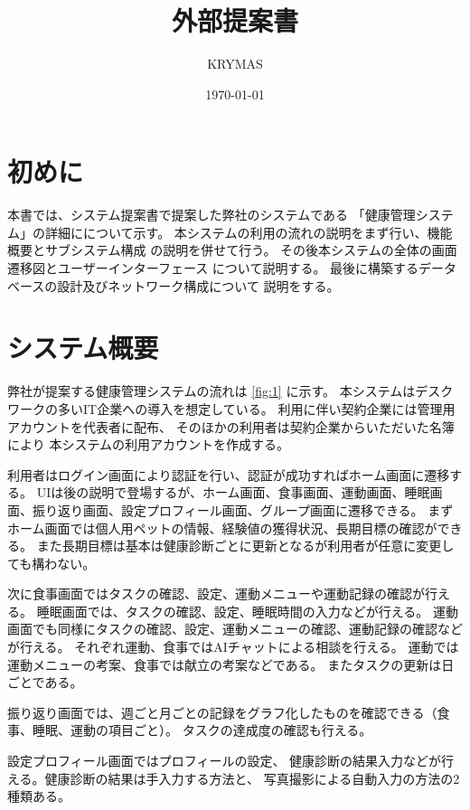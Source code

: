 \documentclass{jlreq}
\begin{document}
\title{外部提案書}

\author{KRYMAS}

\date{\today}

\maketitle

\setcounter{tocdepth}{3}
\tableofcontents
\clearpage

\section{初めに}
本書では、システム提案書で提案した弊社のシステムである
「健康管理システム」の詳細にについて示す。
本システムの利用の流れの説明をまず行い、機能概要とサブシステム構成
の説明を併せて行う。
その後本システムの全体の画面遷移図とユーザーインターフェース
について説明する。
最後に構築するデータベースの設計及びネットワーク構成について
説明をする。

\section{システム概要}
弊社が提案する健康管理システムの流れは
\ref{fig:1}
に示す。
本システムはデスクワークの多いIT企業への導入を想定している。
利用に伴い契約企業には管理用アカウントを代表者に配布、
そのほかの利用者は契約企業からいただいた名簿により
本システムの利用アカウントを作成する。

利用者はログイン画面により認証を行い、認証が成功すればホーム画面に遷移する。
UIは後の説明で登場するが、ホーム画面、食事画面、運動画面、睡眠画面、振り返り画面、設定プロフィール画面、グループ画面に遷移できる。
まずホーム画面では個人用ペットの情報、経験値の獲得状況、長期目標の確認ができる。
また長期目標は基本は健康診断ごとに更新となるが利用者が任意に変更しても構わない。

次に食事画面ではタスクの確認、設定、運動メニューや運動記録の確認が行える。
睡眠画面では、タスクの確認、設定、睡眠時間の入力などが行える。
運動画面でも同様にタスクの確認、設定、運動メニューの確認、運動記録の確認などが行える。
それぞれ運動、食事ではAIチャットによる相談を行える。
運動では運動メニューの考案、食事では献立の考案などである。
またタスクの更新は日ごとである。

振り返り画面では、週ごと月ごとの記録をグラフ化したものを確認できる（食事、睡眠、運動の項目ごと）。
タスクの達成度の確認も行える。

設定プロフィール画面ではプロフィールの設定、
健康診断の結果入力などが行える。健康診断の結果は手入力する方法と、
写真撮影による自動入力の方法の2種類ある。
\end{document}
